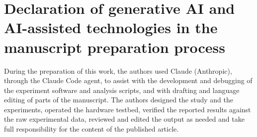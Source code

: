 \section*{Declaration of generative AI and AI-assisted technologies in the manuscript preparation process}
During the preparation of this work, the authors used Claude (Anthropic), through the Claude Code agent, to assist with the development and debugging of the experiment software and analysis scripts, and with drafting and language editing of parts of the manuscript. The authors designed the study and the experiments, operated the hardware testbed, verified the reported results against the raw experimental data, reviewed and edited the output as needed and take full responsibility for the content of the published article.

